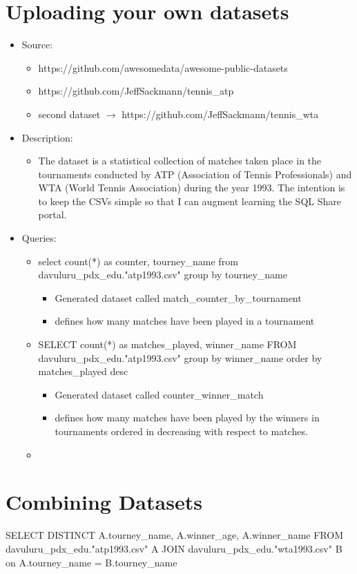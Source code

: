 \documentclass[a4paper]{article}
\begin{document}
\section{Uploading your own datasets}
\begin{itemize}
\item Source:
	\begin{itemize}
    	\item https://github.com/awesomedata/awesome-public-datasets
    	\item https://github.com/JeffSackmann/tennis\_atp
    	\item second dataset \(\rightarrow\) https://github.com/JeffSackmann/tennis\_wta
    \end{itemize}
\item Description:
	\begin{itemize}
	\item The dataset is a statistical collection of matches taken place in the tournaments conducted by ATP (Association of Tennis Professionals) and WTA (World Tennis Association) during the year 1993. The intention is to keep the CSVs simple so that I can augment learning the SQL Share portal. 
	\end{itemize}
\item Queries:
	\begin{itemize}
	\item select count(*) as counter, tourney\_name from davuluru\_pdx\_edu."atp1993.csv" group by tourney\_name
    	\begin{itemize}
    	\item Generated dataset called match\_counter\_by\_tournament
        \item defines how many matches have been played in a tournament
    	\end{itemize}
    \item SELECT count(*) as matches\_played, winner\_name FROM davuluru\_pdx\_edu."atp1993.csv" group by winner\_name order by matches\_played desc
    	\begin{itemize}
    	\item Generated dataset called counter\_winner\_match
        \item defines how many matches have been played by the winners in tournaments ordered in decreasing with respect to matches. 
    	\end{itemize}
    \item 
	\end{itemize}
\end{itemize}
    
\section{Combining Datasets}
SELECT DISTINCT A.tourney\_name, A.winner\_age, A.winner\_name FROM davuluru\_pdx\_edu."atp1993.csv" A JOIN davuluru\_pdx\_edu."wta1993.csv" B on A.tourney\_name = B.tourney\_name
\end{document}
